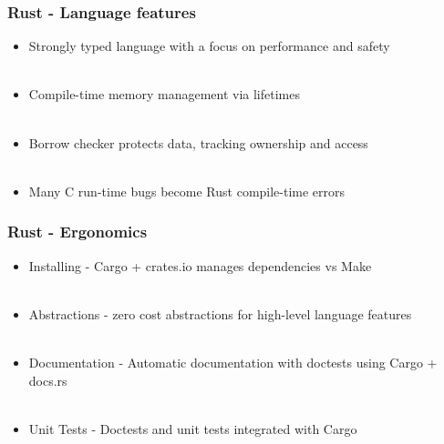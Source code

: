 \documentclass{beamer}
\begin{document}
\begin{frame}
\begin{center}
\frametitle{Rust - Language features}

\begin{itemize}

\item Strongly typed language with a focus on performance and safety\\

~\\

\item Compile-time memory management via lifetimes\\

~\\

\item Borrow checker protects data, tracking ownership and access\\

~\\

\item Many C run-time bugs become Rust compile-time errors\\

\end{itemize}

\end{center}
\end{frame}


\begin{frame}
\begin{center}
\frametitle{Rust - Ergonomics}

\begin{itemize}

\item Installing - Cargo + crates.io manages dependencies vs Make\\

~\\

\item Abstractions - zero cost abstractions for high-level language features\\

~\\

\item Documentation - Automatic documentation with doctests using Cargo + docs.rs\\

~\\

\item Unit Tests - Doctests and unit tests integrated with Cargo\\

\end{itemize}

\end{center}
\end{frame}
\end{document}
